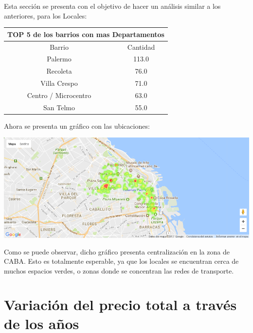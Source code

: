 \documentclass[a4paper, 10pt]{article}
\begin{document}
				Esta sección se presenta con el objetivo de hacer un análisis similar a los anteriores, para los Locales:
				
				\begin{center}
						\begin{tabular}{ |c|c| }
							\hline
							\multicolumn{2}{|c|}{TOP 5 de los barrios con mas Departamentos}\\
							\hline
							\hline
							Barrio & Cantidad\\
							\hline
							Palermo & 113.0 \\
							Recoleta & 76.0 \\
							Villa Crespo & 71.0 \\
							Centro / Microcentro & 63.0 \\
							San Telmo &	55.0 \\
							\hline
						\end{tabular}
					\end{center}
				
				Ahora se presenta un gráfico con las ubicaciones:
				
				\begin{center}
   		    				\includegraphics[width=\textwidth]{images/ubicMLocales}
				\end{center}
				
				Como se puede observar, dicho gráfico presenta centralización en la zona de CABA.
				Esto es totalmente esperable, ya que los locales se encuentran cerca de muchos espacios verdes, o zonas donde se concentran las redes de transporte.
		
		\section{Variación del precio total a través de los años}
			
\end{document}
